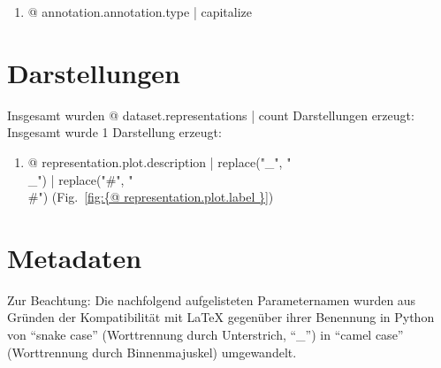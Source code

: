 \begin{enumerate}
\item {@ annotation.annotation.type | capitalize }
\end{enumerate}





\section{Darstellungen}

Insgesamt wurden {@ dataset.representations | count } Darstellungen erzeugt:
Insgesamt wurde 1 Darstellung erzeugt:

\begin{enumerate}
\item {@ representation.plot.description | replace("_", "\\_") | replace("#", "\\#") } (Fig.~\ref{fig:{@ representation.plot.label }})
\end{enumerate}




\clearpage


\section{Metadaten}

Zur Beachtung: Die nachfolgend aufgelisteten Parameternamen wurden aus Gründen der Kompatibilität mit \LaTeX{} gegenüber ihrer Benennung in Python von \enquote{snake case} (Worttrennung durch Unterstrich, \enquote{\_}) in \enquote{camel case} (Worttrennung durch Binnenmajuskel) umgewandelt.




